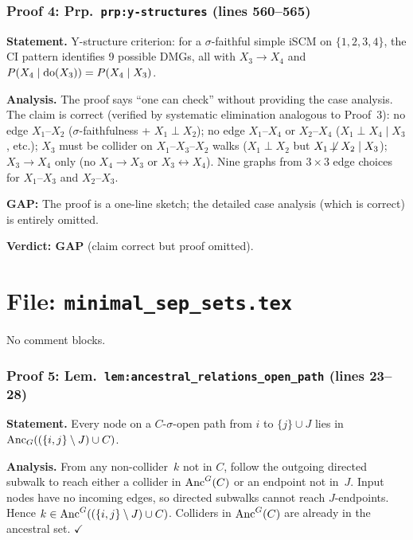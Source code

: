 \documentclass{article}
\begin{document}
\section{Proof 4: Prp.\ \texttt{prp:y-structures} (lines 560--565)}

\textbf{Statement.} Y-structure criterion: for a $\sigma$-faithful simple iSCM
on $\{1,2,3,4\}$, the CI pattern identifies 9 possible DMGs, all with
$X_3\to X_4$ and $P(X_4\mid\operatorname{do}(X_3))=P(X_4\mid X_3)$.

\textbf{Analysis.}
The proof says ``one can check'' without providing the case analysis.
The claim is correct (verified by systematic elimination analogous to Proof~3):
no edge $X_1$--$X_2$ ($\sigma$-faithfulness + $X_1\perp X_2$);
no edge $X_1$--$X_4$ or $X_2$--$X_4$ ($X_1\perp X_4\mid X_3$, etc.);
$X_3$ must be collider on $X_1$--$X_3$--$X_2$ walks
($X_1\perp X_2$ but $X_1\not\!\perp X_2\mid X_3$);
$X_3\to X_4$ only (no $X_4\to X_3$ or $X_3\leftrightarrow X_4$).
Nine graphs from $3\times 3$ edge choices for $X_1$--$X_3$ and $X_2$--$X_3$.

\textbf{GAP:} The proof is a one-line sketch; the detailed case analysis
(which is correct) is entirely omitted.

\textbf{Verdict: GAP} (claim correct but proof omitted).

\part*{File: \texttt{minimal\_sep\_sets.tex}}

No comment blocks.

\section{Proof 5: Lem.\ \texttt{lem:ancestral\_relations\_open\_path}
(lines 23--28)}

\textbf{Statement.} Every node on a $C$-$\sigma$-open path from $i$ to
$\{j\}\cup J$ lies in $\mathrm{Anc}_G((\{i,j\}\setminus J)\cup C)$.

\textbf{Analysis.}
From any non-collider~$k$ not in $C$, follow the outgoing directed subwalk
to reach either a collider in $\mathrm{Anc}^G(C)$ or an endpoint not in~$J$.
Input nodes have no incoming edges, so directed subwalks cannot reach
$J$-endpoints.  Hence $k\in\mathrm{Anc}^G((\{i,j\}\setminus J)\cup C)$.
Colliders in $\mathrm{Anc}^G(C)$ are already in the ancestral set.  $\checkmark$
\end{document}
